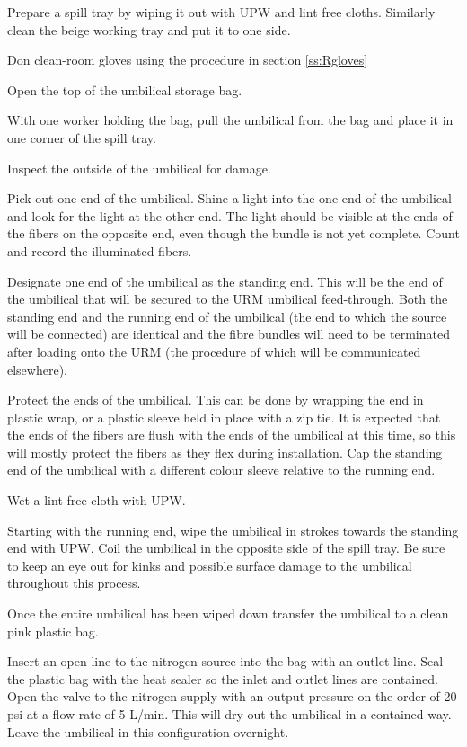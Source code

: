 \documentclass[11pt]{article}
\begin{document}
\begin{answerlist}
\item Prepare a spill tray by wiping it out with UPW and lint free
  cloths. Similarly clean the beige working tray and put it to one
  side.
\item Don clean-room gloves using the procedure in section \ref{ss:Rgloves}
\item Open the top of the umbilical storage bag. 
\item With one worker holding the bag, pull the umbilical from the bag
  and place it in one corner of the spill tray.
\item Inspect the outside of the umbilical for damage.
\item Pick out one end of the umbilical. Shine a light into the one
  end of the umbilical and look for the light at the other end. The
  light should be visible at the ends of the fibers on the opposite
  end, even though the bundle is not yet complete. Count and record
  the illuminated fibers.
\item Designate one end of the umbilical as the standing end. This
  will be the end of the umbilical that will be secured to the URM
  umbilical feed-through. Both the standing end and the running end of
  the umbilical (the end to which the source will be connected) are
  identical and the fibre bundles will need to be terminated after
  loading onto the URM (the procedure of which will be communicated
  elsewhere).
\item Protect the ends of the umbilical. This can be done by wrapping
  the end in plastic wrap, or a plastic sleeve held in place with a
  zip tie. It is expected that the ends of the fibers are flush with
  the ends of the umbilical at this time, so this will mostly
  protect the fibers as they flex during installation. Cap the standing
  end of the umbilical with a different colour sleeve relative to the
  running end.
\item Wet a lint free cloth with UPW.
\item Starting with the running end, wipe the umbilical in strokes
  towards the standing end with UPW. Coil the umbilical in the
  opposite side of the spill tray. Be sure to keep an eye out for
  kinks and possible surface damage to the umbilical throughout this
  process.
\item Once the entire umbilical has been wiped down transfer the umbilical to a clean pink plastic bag.
\item Insert an open line to the nitrogen source into the bag with an outlet line. Seal the plastic bag with the heat sealer so the inlet and outlet lines are contained. Open the valve to the nitrogen supply with an output pressure on the order of 20 psi at a flow rate of 5 L/min. This will dry out the umbilical in a contained way. Leave the umbilical in this configuration overnight.

\end{answerlist}
\end{document}
